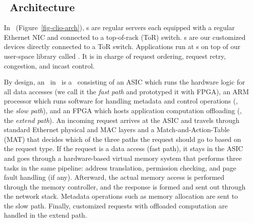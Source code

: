 \subsection{\sys\ Architecture}

In \sys\ (Figure~\ref{fig-clio-arch}), \CN{}s are regular servers each equipped with a regular Ethernet NIC and connected to a top-of-rack (ToR) switch.
\MN{}s are our customized devices directly connected to a ToR switch.
%
Applications run at \CN{}s on top of our user-space library called {\em \syslib}.
It is in charge of request ordering, request retry, congestion, and incast control. 

By design, an \MN\ in \sys\ is a \sysboard\ consisting of an ASIC which runs the hardware logic for all data accesses (we call it the {\em fast path} and prototyped it with FPGA),
an ARM processor which runs software for handling metadata and control operations (\ie, the {\em slow path}),
and an FPGA which hosts application computation offloading (\ie, the {\em extend path}).
An incoming request arrives at the ASIC and travels through standard Ethernet physical and MAC layers 
and a Match-and-Action-Table (MAT) that decides which of the three paths the request should go to based on the request type.
If the request is a data access (fast path), it stays in the ASIC and goes through a hardware-based virtual memory system
that performs three tasks in the same pipeline: address translation, permission checking, and page fault handling (if any).
Afterward, the actual memory access is performed through the memory controller, and the response is formed and sent out through the network stack.
Metadata operations such as memory allocation are sent to the slow path. %
Finally, customized requests with %
offloaded computation are handled in the extend path.